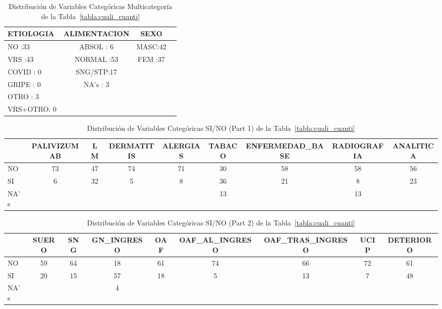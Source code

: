 \newpage
\thispagestyle{empty}
\begin{landscape}
\begin{table}[h]
    \centering
    \caption{Distribución de Variables Categóricas Multicategoría de la Tabla~\ref{tabla:cuali_cuanti}}
    \begin{tabular}{lccc}
    \hline
    ETIOLOGIA & ALIMENTACION & SEXO \\
    \hline
    NO      :33   & ABSOL  : 6    & MASC:42 \\
    VRS     :43   & NORMAL :53    & FEM :37 \\
    COVID   : 0   & SNG/STP:17    & \\
    GRIPE   : 0   & NA's   : 3    & \\
    OTRO    : 3   &                & \\
    VRS+OTRO: 0   &                & \\
    \hline
    \end{tabular}\label{tabla:distribucion_variables_categoricas_multicat}
\end{table}

\begin{table}[h]
    \centering
    \caption{Distribución de Variables Categóricas SI/NO (Part 1) de la Tabla~\ref{tabla:cuali_cuanti}}
    \begin{tabular}{lcccccccc}
    \hline
        ~ & PALIVIZUMAB & LM & DERMATITIS & ALERGIAS & TABACO & ENFERMEDAD\_BASE & RADIOGRAFIA & ANALITICA \\
        \hline
        NO & 73 & 47 & 74 & 71 & 30 & 58 & 58 & 56 \\
        SI & 6 & 32 & 5 & 8 & 36 & 21 & 8 & 23 \\
        NA's & ~ & ~ & ~ & ~ & 13 & ~ & 13 & ~ \\
        \hline
    \end{tabular}
    \label{tabla:distribucion_variables_categoricas_si_no_1}
\end{table}

\begin{table}[h]
    \centering
    \caption{Distribución de Variables Categóricas SI/NO (Part 2) de la Tabla~\ref{tabla:cuali_cuanti}}
    \begin{tabular}{lcccccccc}
    \hline
        ~ & SUERO & SNG & GN\_INGRESO & OAF & OAF\_AL\_INGRESO & OAF\_TRAS\_INGRESO & UCIP & DETERIORO \\
        \hline
        NO & 59 & 64 & 18 & 61 & 74 & 66 & 72 & 61 \\
        SI & 20 & 15 & 57 & 18 & 5 & 13 & 7 & 48 \\
        NA's & ~ & ~ & 4 & ~ & ~ & ~ & ~ & ~ \\
        \hline
    \end{tabular}
    \label{tabla:distribucion_variables_categoricas_si_no_2}
\end{table}


\end{landscape}

